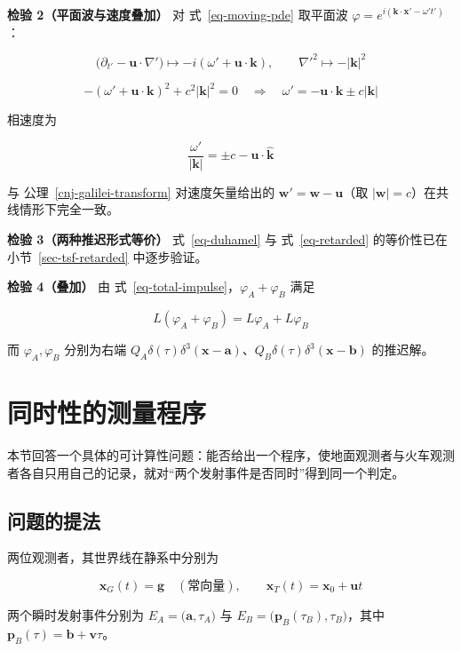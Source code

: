 \documentclass[
  chinese,
  a4paper,
  UTF8,
  12pt,
  oneside,
  openany]{ctexbook}
\theoremstyle{plain}
\theoremstyle{plain}
\theoremstyle{plain}
\theoremstyle{definition}
\theoremstyle{plain}
\theoremstyle{plain}
\theoremstyle{remark}
\begin{document}
\textbf{检验 2（平面波与速度叠加）} 对 式~\ref{eq-moving-pde} 取平面波
\(\varphi=e^{i(\mathbf{k}\cdot\mathbf{x}'-\omega't')}\)：

\[
\bigl(\partial_{t'}-\mathbf{u}\cdot\nabla'\bigr)\mapsto-i(\omega'+\mathbf{u}\cdot\mathbf{k}),\qquad \nabla'^{2}\mapsto-|\mathbf{k}|^{2}
\]

\[
-(\omega'+\mathbf{u}\cdot\mathbf{k})^{2}+c^{2}|\mathbf{k}|^{2}=0
\quad\Longrightarrow\quad
\omega'=-\mathbf{u}\cdot\mathbf{k}\pm c|\mathbf{k}|
\]

相速度为

\[
\frac{\omega'}{|\mathbf{k}|}=\pm c-\mathbf{u}\cdot\hat{\mathbf{k}}
\]

与 公理~\ref{cnj-galilei-transform} 对速度矢量给出的
\(\mathbf{w}'=\mathbf{w}-\mathbf{u}\)（取
\(|\mathbf{w}|=c\)）在共线情形下完全一致。

\textbf{检验 3（两种推迟形式等价）} 式~\ref{eq-duhamel} 与
式~\ref{eq-retarded} 的等价性已在 小节~\ref{sec-tsf-retarded}
中逐步验证。

\textbf{检验 4（叠加）} 由
式~\ref{eq-total-impulse}，\(\varphi_{A}+\varphi_{B}\) 满足

\[
L(\varphi_{A}+\varphi_{B})=L\varphi_{A}+L\varphi_{B}
\]

而 \(\varphi_{A},\varphi_{B}\) 分别为右端
\(Q_{A}\delta(\tau)\delta^{3}(\mathbf{x}-\mathbf{a})\)、\(Q_{B}\delta(\tau)\delta^{3}(\mathbf{x}-\mathbf{b})\)
的推迟解。

\section{同时性的测量程序}\label{sec-tsf-measurement}

本节回答一个具体的可计算性问题：能否给出一个程序，使地面观测者与火车观测者各自只用自己的记录，就对``两个发射事件是否同时''得到同一个判定。

\subsection{问题的提法}\label{ux95eeux9898ux7684ux63d0ux6cd5}

两位观测者，其世界线在静系中分别为

\[
\mathbf{x}_{G}(t)=\mathbf{g}\quad(\text{常向量}),\qquad \mathbf{x}_{T}(t)=\mathbf{x}_{0}+\mathbf{u}t
\]

两个瞬时发射事件分别为 \(E_{A}=\bigl(\mathbf{a},\tau_{A}\bigr)\) 与
\(E_{B}=\bigl(\mathbf{p}_{B}(\tau_{B}),\tau_{B}\bigr)\)，其中
\(\mathbf{p}_{B}(\tau)=\mathbf{b}+\mathbf{v}\tau\)。
\end{document}
